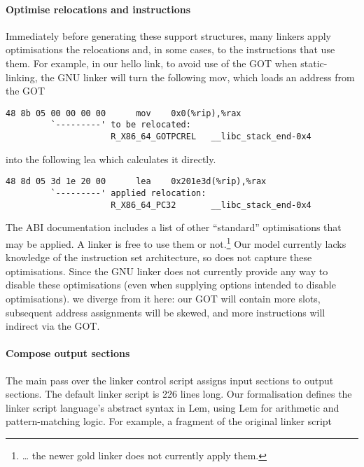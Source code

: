 \paragraph{Optimise relocations and instructions} 
Immediately before generating these support structures, 
many linkers apply optimisations the relocations and, in some cases,
to the instructions that use them.
For example, in our \textsf{hello} link, 
to avoid use of the GOT when static-linking, the GNU linker will turn 
the following \textsf{mov}, which loads an address from the GOT

\begin{lstlisting}[basicstyle=\footnotesize\ttfamily,columns=fixed,language=plain]
48 8b 05 00 00 00 00      mov    0x0(%rip),%rax
         `---------' to be relocated: 
                     R_X86_64_GOTPCREL   __libc_stack_end-0x4
\end{lstlisting}

into the following \textsf{lea} which calculates it directly.

\begin{lstlisting}[basicstyle=\footnotesize\ttfamily,columns=fixed,language=plain]
48 8d 05 3d 1e 20 00      lea    0x201e3d(%rip),%rax
         `---------' applied relocation:
                     R_X86_64_PC32       __libc_stack_end-0x4
\end{lstlisting}

The ABI documentation includes a list of other ``standard'' optimisations that may be applied. 
A linker is free to use them or not.\footnote{\ldots{} the newer \textsf{gold} linker 
does not currently apply them.}
Our model currently lacks knowledge of the instruction set architecture, so does not capture these optimisations.
Since the GNU linker does not currently provide any way to disable these optimisations
(even when supplying options intended to disable optimisations).
we diverge from it here: our GOT will contain more slots,
subsequent address assignments will be skewed,
and more instructions will indirect via the GOT.

\paragraph{Compose output sections} The main pass over the linker control script
assigns input sections to output sections.
The default linker script is 226 lines long.
Our formalisation defines the linker script language's abstract syntax in Lem,
using Lem for arithmetic and pattern-matching logic.
For example, a fragment of the original linker script

